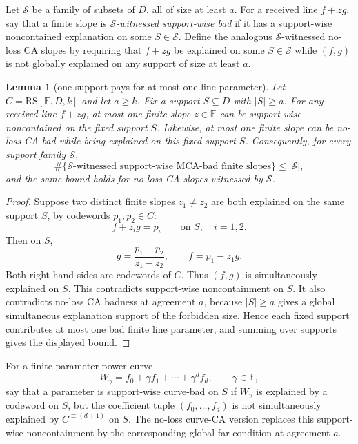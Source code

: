 \documentclass[11pt]{article}
\newtheorem{lemma}[theorem]{Lemma}
\theoremstyle{definition}
\theoremstyle{remark}
\newcommand{\F}{\mathbb{F}}
\newcommand{\RS}{\mathrm{RS}}
\begin{document}
Let $\mathcal S$ be a family of subsets of $D$, all of size at least $a$.  For a
received line $f+zg$, say that a finite slope is
\emph{$\mathcal S$-witnessed support-wise bad} if it has a support-wise
noncontained explanation on some $S\in\mathcal S$.  Define the analogous
$\mathcal S$-witnessed no-loss CA slopes by requiring that $f+zg$ be explained
on some $S\in\mathcal S$ while $(f,g)$ is not globally explained on any support
of size at least $a$.

\begin{lemma}[one support pays for at most one line parameter]
\label{lem:one-support-one-line}
Let $C=\RS[\F,D,k]$ and let $a\ge k$.  Fix a support
$S\subseteq D$ with $|S|\ge a$.  For any received line $f+zg$, at most one finite
slope $z\in\F$ can be support-wise noncontained on the fixed support $S$.
Likewise, at most one finite slope can be no-loss CA-bad while being explained on
this fixed support $S$.  Consequently, for every support family $\mathcal S$,
\[
        \#\{\mathcal S\text{-witnessed support-wise MCA-bad finite slopes}\}
        \le |\mathcal S|,
\]
and the same bound holds for no-loss CA slopes witnessed by $\mathcal S$.
\end{lemma}

\begin{proof}
Suppose two distinct finite slopes $z_1\ne z_2$ are both explained on the same
support $S$, by codewords $p_1,p_2\in C$:
\[
        f+z_i g=p_i\qquad\text{on }S,\quad i=1,2.
\]
Then on $S$,
\[
        g=\frac{p_1-p_2}{z_1-z_2},\qquad
        f=p_1-z_1g.
\]
Both right-hand sides are codewords of $C$.  Thus $(f,g)$ is simultaneously
explained on $S$.  This contradicts support-wise noncontainment on $S$.  It also
contradicts no-loss CA badness at agreement $a$, because $|S|\ge a$ gives a
global simultaneous explanation support of the forbidden size.  Hence each fixed
support contributes at most one bad finite line parameter, and summing over
supports gives the displayed bound.
\end{proof}

For a finite-parameter power curve
\[
        W_\gamma=f_0+\gamma f_1+\cdots+\gamma^d f_d,
        \qquad \gamma\in\F,
\]
say that a parameter is support-wise curve-bad on $S$ if $W_\gamma$ is explained
by a codeword on $S$, but the coefficient tuple $(f_0,\ldots,f_d)$ is not
simultaneously explained by $C^{\equiv(d+1)}$ on $S$.  The no-loss curve-CA
version replaces this support-wise noncontainment by the corresponding global
far condition at agreement $a$.
\end{document}
